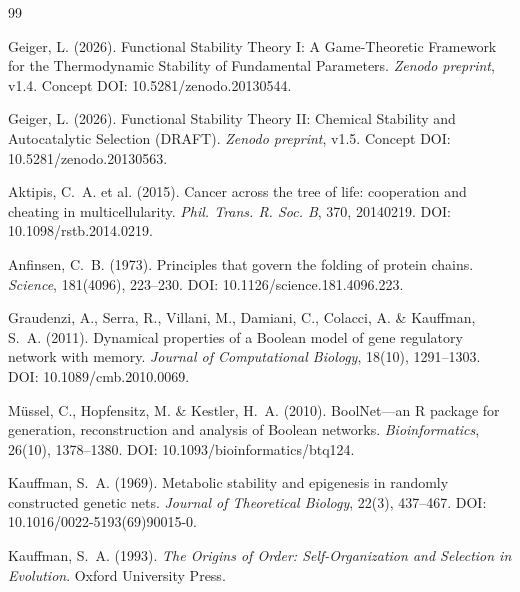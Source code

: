 \documentclass[12pt,a4paper]{article}
\theoremstyle{remark}
\begin{document}

\begin{thebibliography}{99}
\small
\setlength{\itemsep}{0pt}
\setlength{\parskip}{0pt}
\setlength{\parsep}{0pt}

Geiger, L. (2026).
\newblock Functional Stability Theory I: A Game-Theoretic Framework for the Thermodynamic Stability of Fundamental Parameters.
\newblock \textit{Zenodo preprint}, v1.4.
\newblock Concept DOI: 10.5281/zenodo.20130544.

Geiger, L. (2026).
\newblock Functional Stability Theory II: Chemical Stability and Autocatalytic Selection (DRAFT).
\newblock \textit{Zenodo preprint}, v1.5.
\newblock Concept DOI: 10.5281/zenodo.20130563.

Aktipis, C.~A. et al. (2015).
\newblock Cancer across the tree of life: cooperation and cheating in multicellularity.
\newblock \textit{Phil. Trans. R. Soc. B}, 370, 20140219.
\newblock DOI: 10.1098/rstb.2014.0219.

Anfinsen, C.~B. (1973).
\newblock Principles that govern the folding of protein chains.
\newblock \textit{Science}, 181(4096), 223--230.
\newblock DOI: 10.1126/science.181.4096.223.

Graudenzi, A., Serra, R., Villani, M., Damiani, C., Colacci, A. \& Kauffman, S.~A. (2011).
\newblock Dynamical properties of a Boolean model of gene regulatory network with memory.
\newblock \textit{Journal of Computational Biology}, 18(10), 1291--1303.
\newblock DOI: 10.1089/cmb.2010.0069.

Müssel, C., Hopfensitz, M. \& Kestler, H.~A. (2010).
\newblock BoolNet---an R package for generation, reconstruction and analysis of Boolean networks.
\newblock \textit{Bioinformatics}, 26(10), 1378--1380.
\newblock DOI: 10.1093/bioinformatics/btq124.

Kauffman, S.~A. (1969).
\newblock Metabolic stability and epigenesis in randomly constructed genetic nets.
\newblock \textit{Journal of Theoretical Biology}, 22(3), 437--467.
\newblock DOI: 10.1016/0022-5193(69)90015-0.

Kauffman, S.~A. (1993).
\newblock \textit{The Origins of Order: Self-Organization and Selection in Evolution}.
\newblock Oxford University Press.


\end{thebibliography}
\end{document}
